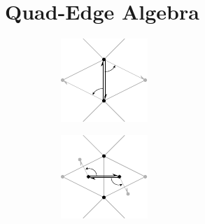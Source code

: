 \documentclass{stdlocal}
\begin{document}
\section{Quad-Edge Algebra} %
\label{sec:quad_edge_algebra}

\begin{figure}[H]
  \centering
  \begin{subfigure}[b]{0.4\linewidth}
    \centering
    \includegraphics[width=\linewidth]{figures/quad-edge-edge.pdf}
  \end{subfigure}
  \hfill
  \begin{subfigure}[b]{0.4\linewidth}
    \centering
    \includegraphics[width=\linewidth]{figures/quad-edge-dual.pdf}

\end{subfigure}
\end{figure}
\end{document}
